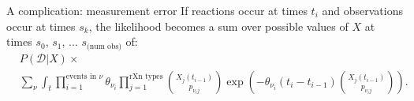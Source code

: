 \documentclass[12pt,a4paper,t,xcolor=dvipsnames,slidestop,compress,mathserif]{beamer}
\begin{document}
\begin{frame}{A complication: measurement error}
If reactions occur at times $t_i$ and observations occur at times $s_k$, the likelihood becomes a sum over possible values of $X$ at times $s_0$, $s_1$, ... $s_\text{(num obs)}$ of:
\begin{align*}
& P(\mathcal{D}|X) \times \\
&\sum_{\nu}\int_{t} \prod_{i=1}^\text{events in $\nu$} \theta_{\nu_{i}} \prod_{j=1}^\text{rXn types} {{X_{j}(t_{i-1})}\choose{p_{{\nu_{i}}j}}}\exp\left(-\theta_{\nu_{i}}
(t_i - t_{i-1}) {{X_j(t_{i-1})}\choose{p_{{\nu_{i}}j}}} \right).
\end{align*}


\end{frame}
\end{document}
